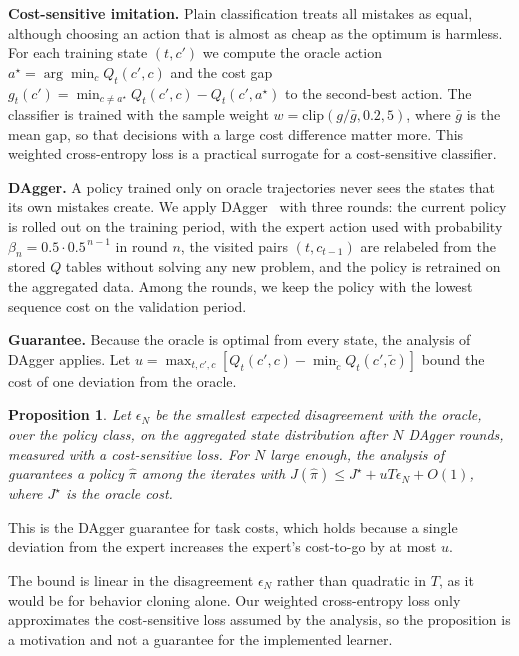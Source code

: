 \documentclass[journal]{IEEEtran}
\newtheorem{proposition}{Proposition}
\begin{document}
\textbf{Cost-sensitive imitation.} Plain classification treats all mistakes as equal, although choosing an action that is almost as cheap as the optimum is harmless. For each training state $(t,c')$ we compute the oracle action $a^\star=\arg\min_c Q_t(c',c)$ and the cost gap $g_t(c')=\min_{c\neq a^\star}Q_t(c',c)-Q_t(c',a^\star)$ to the second-best action. The classifier is trained with the sample weight $w=\mathrm{clip}(g/\bar g,0.2,5)$, where $\bar g$ is the mean gap, so that decisions with a large cost difference matter more. This weighted cross-entropy loss is a practical surrogate for a cost-sensitive classifier.

\textbf{DAgger.} A policy trained only on oracle trajectories never sees the states that its own mistakes create. We apply DAgger~\cite{ross2011dagger} with three rounds: the current policy is rolled out on the training period, with the expert action used with probability $\beta_n=0.5\cdot0.5^{\,n-1}$ in round $n$, the visited pairs $(t,c_{t-1})$ are relabeled from the stored $Q$ tables without solving any new problem, and the policy is retrained on the aggregated data. Among the rounds, we keep the policy with the lowest sequence cost on the validation period.

\textbf{Guarantee.} Because the oracle is optimal from every state, the analysis of DAgger applies. Let $u=\max_{t,c',c}[Q_t(c',c)-\min_{\tilde c}Q_t(c',\tilde c)]$ bound the cost of one deviation from the oracle.

\begin{proposition}\label{prop:imitation}
Let $\epsilon_N$ be the smallest expected disagreement with the oracle, over the policy class, on the aggregated state distribution after $N$ DAgger rounds, measured with a cost-sensitive loss. For $N$ large enough, the analysis of~\cite{ross2011dagger} guarantees a policy $\hat\pi$ among the iterates with $J(\hat\pi)\le J^\star+uT\epsilon_N+O(1)$, where $J^\star$ is the oracle cost.
\end{proposition}
\begin{IEEEproof}
This is the DAgger guarantee for task costs, which holds because a single deviation from the expert increases the expert's cost-to-go by at most $u$.
\end{IEEEproof}

The bound is linear in the disagreement $\epsilon_N$ rather than quadratic in $T$, as it would be for behavior cloning alone. Our weighted cross-entropy loss only approximates the cost-sensitive loss assumed by the analysis, so the proposition is a motivation and not a guarantee for the implemented learner.
\end{document}
